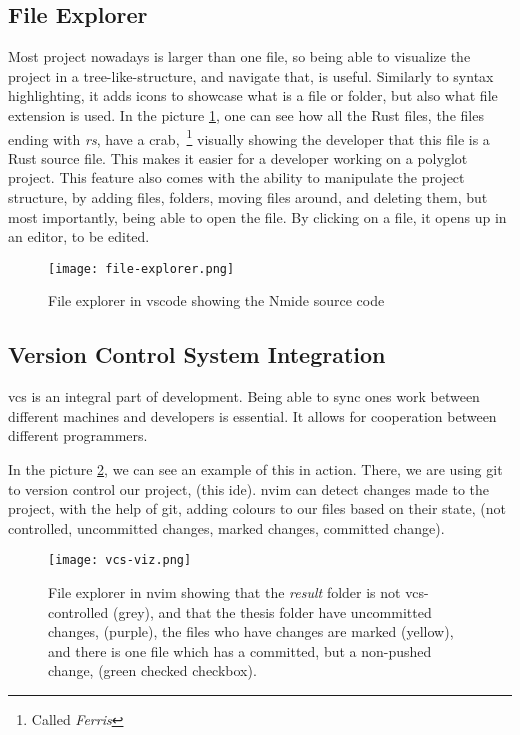 \subsection{File Explorer}

Most project nowadays is larger than one file, so being able to visualize the
project in a tree-like-structure, and navigate that, is useful. Similarly to
syntax highlighting, it adds icons to showcase what is a file or folder, but
also what file extension is used. In the picture \ref{pic:fileEx}, one can see
how all the Rust files, the files ending with \textit{rs}, have a crab,~\footnote{Called \textit{Ferris}}
visually showing the developer that this file is a Rust source file. This makes
it easier for a developer working on a polyglot project. This feature also comes
with the ability to manipulate the project structure, by adding files, folders,
moving files around, and deleting them, but most importantly, being able to open
the file. By clicking on a file, it opens up in an editor, to be edited.

\begin{figure}
  \centering
  \texttt{[image: file-explorer.png]}
  \caption{File explorer in \gls*{vscode} showing the Nmide source code}
  \label{pic:fileEx}
\end{figure}

\subsection{Version Control System Integration}

\gls*{vcs} is an integral part of development. Being able to sync ones work
between different machines and developers is essential. It allows for
cooperation between different programmers.

In the picture \ref{pic:vcsViz}, we can see an example of this in action. There,
we are using \gls*{git} to version control our project, (this \gls*{ide}).
\gls*{nvim} can detect changes made to the project, with the help of \gls*{git},
adding colours to our files based on their state, (not controlled, uncommitted
changes, marked changes, committed change).

\begin{figure}
  \centering
  \texttt{[image: vcs-viz.png]}
  \caption{
    File explorer in \gls*{nvim} showing that the \textit{result} folder is
    not \gls*{vcs}-controlled (grey), and that the thesis folder have uncommitted
    changes, (purple), the files who have changes are marked (yellow), and there
    is one file which has a committed, but a non-pushed change, (green checked
    checkbox).
  }
  \label{pic:vcsViz}
\end{figure}

